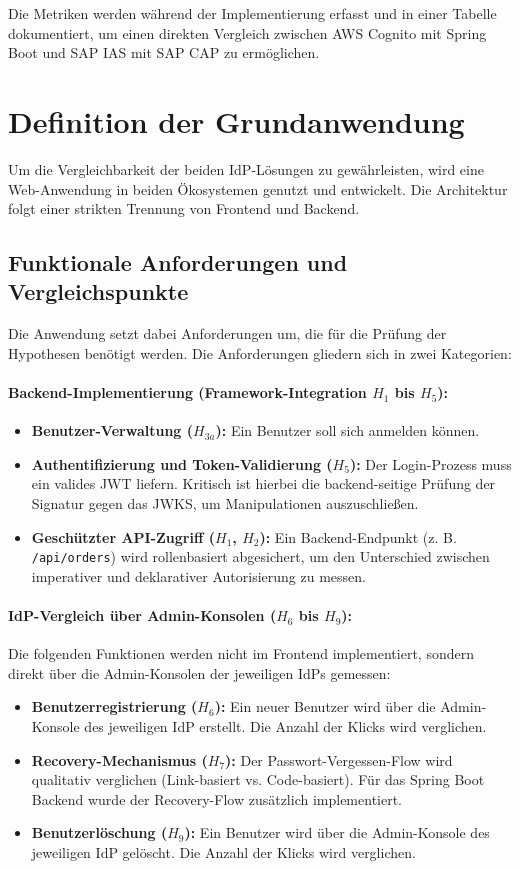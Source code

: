 Die Metriken werden während der Implementierung erfasst und in
einer Tabelle dokumentiert, um einen direkten Vergleich zwischen
\ac{AWS} Cognito mit Spring Boot und \ac{SAP IAS} mit \ac{SAP CAP}
zu ermöglichen.

\section{Definition der Grundanwendung}
\label{sec:grundanwendung}
Um die Vergleichbarkeit der beiden \ac{IdP}-Lösungen zu gewährleisten, wird eine Web-Anwendung in beiden Ökosystemen genutzt und entwickelt. Die Architektur folgt einer strikten Trennung von Frontend und Backend.

\subsection{Funktionale Anforderungen und Vergleichspunkte}
Die Anwendung setzt dabei Anforderungen um, die für die Prüfung der Hypothesen benötigt werden. Die Anforderungen gliedern sich in zwei Kategorien:

\paragraph{Backend-Implementierung (Framework-Integration $H_1$ bis $H_5$):}
\begin{itemize}
    \item \textbf{Benutzer-Verwaltung ($H_{3a}$):} Ein Benutzer soll sich anmelden können.
    \item \textbf{Authentifizierung und Token-Validierung ($H_5$):} Der Login-Prozess muss ein valides \ac{JWT} liefern. Kritisch ist hierbei die backend-seitige Prüfung der Signatur gegen das \ac{JWKS}, um Manipulationen auszuschließen.
    \item \textbf{Geschützter API-Zugriff ($H_1$, $H_2$):} Ein Backend-Endpunkt (z. B. \texttt{/api/orders}) wird rollenbasiert abgesichert, um den Unterschied zwischen imperativer und deklarativer Autorisierung zu messen.
\end{itemize}

\paragraph{IdP-Vergleich über Admin-Konsolen ($H_6$ bis $H_9$):}
Die folgenden Funktionen werden nicht im Frontend implementiert, sondern direkt über die Admin-Konsolen der jeweiligen \ac{IdP}s gemessen:
\begin{itemize}
    \item \textbf{Benutzerregistrierung ($H_6$):} Ein neuer Benutzer wird über die Admin-Konsole des jeweiligen \ac{IdP} erstellt. Die Anzahl der Klicks wird verglichen.
    \item \textbf{Recovery-Mechanismus ($H_7$):} Der Passwort-Vergessen-Flow wird qualitativ verglichen (Link-basiert vs. Code-basiert). Für das Spring Boot Backend wurde der Recovery-Flow zusätzlich implementiert.
    \item \textbf{Benutzerlöschung ($H_9$):} Ein Benutzer wird über die Admin-Konsole des jeweiligen \ac{IdP} gelöscht. Die Anzahl der Klicks wird verglichen.
\end{itemize}


